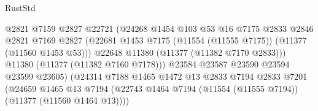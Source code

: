 \begin{lexlean}{RustStd}
\begin{coremodule}
                                            @2821
                                            @7159
                                            @2827
                                            @22721
                                            (@24268
                                              @1454
                                              @103
                                              @53
                                              @16
                                              @7175
                                              @2833
                                              @2846
                                              @2821
                                              @7169
                                              @2827
                                              (@22681
                                                @1453
                                                @7175
                                                (@11554 (@11555 @7175))
                                                (@11377 (@11560 @1453 @53)))
                                              @22648
                                              @11380
                                              (@11377 (@11382 @7170 @2833)))
                                            @11380
                                            (@11377 (@11382 @7160 @7178)))
                                          @23584
                                          @23587
                                          @23590
                                          @23594
                                          @23599
                                          @23605)
                                        (@24314
                                          @7188
                                          @1465
                                          @1472
                                          @13
                                          @2833
                                          @7194
                                          @2833
                                          @7201
                                          (@24659
                                            @1465
                                            @13
                                            @7194
                                            (@22743
                                              @1464
                                              @7194
                                              (@11554 (@11555 @7194))
                                              (@11377 (@11560 @1464 @13))))

\end{coremodule}
\end{lexlean}
